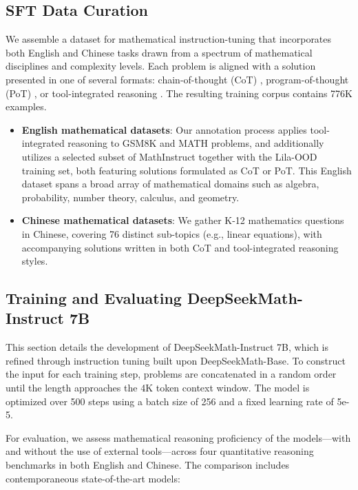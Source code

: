 \begin{itemize}[topsep=0pt]
\subsection{SFT Data Curation}

We assemble a dataset for mathematical instruction-tuning that incorporates both English and Chinese tasks drawn from a spectrum of mathematical disciplines and complexity levels. Each problem is aligned with a solution presented in one of several formats: chain-of-thought (CoT) \citep{cot}, program-of-thought (PoT) \citep{pot,pal}, or tool-integrated reasoning \citep{tora}. The resulting training corpus contains 776K examples.

\begin{itemize}[topsep=0pt]
    \item \textbf{English mathematical datasets}: Our annotation process applies tool-integrated reasoning to GSM8K and MATH problems, and additionally utilizes a selected subset of MathInstruct \citep{MathInstruct} together with the Lila-OOD \citep{lila} training set, both featuring solutions formulated as CoT or PoT. This English dataset spans a broad array of mathematical domains such as algebra, probability, number theory, calculus, and geometry.
    \item \textbf{Chinese mathematical datasets}: We gather K-12 mathematics questions in Chinese, covering 76 distinct sub-topics (e.g., linear equations), with accompanying solutions written in both CoT and tool-integrated reasoning styles.
\end{itemize}

\subsection{Training and Evaluating DeepSeekMath-Instruct 7B}

This section details the development of DeepSeekMath-Instruct 7B, which is refined through instruction tuning built upon DeepSeekMath-Base. To construct the input for each training step, problems are concatenated in a random order until the length approaches the 4K token context window. The model is optimized over 500 steps using a batch size of 256 and a fixed learning rate of 5e-5.

For evaluation, we assess mathematical reasoning proficiency of the models—with and without the use of external tools—across four quantitative reasoning benchmarks in both English and Chinese. The comparison includes contemporaneous state-of-the-art models:


\end{itemize}
